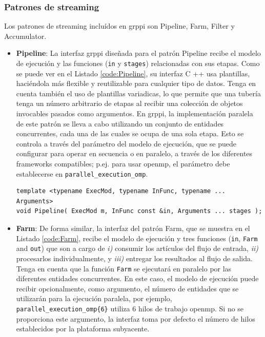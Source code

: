 \subsubsection{Patrones de streaming}

Los patrones de streaming incluídos en \acrshort{grppi} son Pipeline, Farm, Filter y Accumulator.

\begin{itemize}
    \item \textbf{Pipeline}: La interfaz \acrshort{grppi} diseñada para el patrón Pipeline recibe el modelo de ejecución y las funciones (\texttt{in} y \texttt{stages}) relacionadas con sus etapas. Como se puede ver en el Listado \ref{code:Pipeline}, su interfaz C ++ usa plantillas, haciéndola más flexible y reutilizable para cualquier tipo de datos. Tenga en cuenta también el uso de plantillas variadicas, lo que permite que una tubería tenga un número arbitrario de etapas al recibir una colección de objetos invocables pasados como argumentos. En \acrshort{grppi}, la implementación paralela de este patrón se lleva a cabo utilizando un conjunto de entidades concurrentes, cada una de las cuales se ocupa de una sola etapa. Esto se controla a través del parámetro del modelo de ejecución, que se puede configurar para operar en secuencia o en paralelo, a través de los diferentes frameworks compatibles; p.ej. para usar \acrshort{openmp}, el parámetro debe establecerse en \texttt{parallel\_execution\_omp}.
    
    \vspace{0.35cm}
    \begin{lstlisting}[frame=single,label={code:Pipeline},caption={Interfaz Pipeline.}]
template <typename ExecMod, typename InFunc, typename ... Arguments>
void Pipeline( ExecMod m, InFunc const &in, Arguments ... stages );
\end{lstlisting}
\vspace{0.35cm}

    \item \textbf{Farm}: De forma similar, la interfaz del patrón Farm, que se muestra en el Listado \ref{code:Farm}, recibe el modelo de ejecución y tres funciones (\texttt{in}, \texttt{Farm} and \texttt{out}) que son a cargo de \emph{i)} consumir los artículos del flujo de entrada, \emph{ii)} procesarlos individualmente, y \emph{iii)} entregar los resultados al flujo de salida. Tenga en cuenta que la función \texttt{Farm} se ejecutará en paralelo por las diferentes entidades concurrentes. En este caso, el modelo de ejecución puede recibir opcionalmente, como argumento, el número de entidades que se utilizarán para la ejecución paralela, por ejemplo, \texttt{parallel\_execution\_omp\{6\}} utiliza 6 hilos de trabajo \acrshort{openmp}. Si no se proporciona este argumento, la interfaz toma por defecto el número de hilos establecidos por la plataforma subyacente.
    

\end{itemize}
